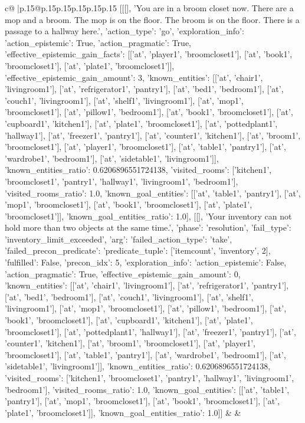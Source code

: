\documentclass{article}
\begin{document}
{\begin{supertabular}{c@{$\;$}|p{.15\linewidth}@{}p{.15\linewidth}p{.15\linewidth}p{.15\linewidth}p{.15\linewidth}p{.15\linewidth}}
{{{	 [[[], 'You are in a broom closet now. There are a mop and a broom. The mop is on the floor. The broom is on the floor. There is a passage to a hallway here.', {'action_type': 'go', 'exploration_info': {'action_epistemic': True, 'action_pragmatic': True, 'effective_epistemic_gain_facts': [['at', 'player1', 'broomcloset1'], ['at', 'book1', 'broomcloset1'], ['at', 'plate1', 'broomcloset1']], 'effective_epistemic_gain_amount': 3, 'known_entities': [['at', 'chair1', 'livingroom1'], ['at', 'refrigerator1', 'pantry1'], ['at', 'bed1', 'bedroom1'], ['at', 'couch1', 'livingroom1'], ['at', 'shelf1', 'livingroom1'], ['at', 'mop1', 'broomcloset1'], ['at', 'pillow1', 'bedroom1'], ['at', 'book1', 'broomcloset1'], ['at', 'cupboard1', 'kitchen1'], ['at', 'plate1', 'broomcloset1'], ['at', 'pottedplant1', 'hallway1'], ['at', 'freezer1', 'pantry1'], ['at', 'counter1', 'kitchen1'], ['at', 'broom1', 'broomcloset1'], ['at', 'player1', 'broomcloset1'], ['at', 'table1', 'pantry1'], ['at', 'wardrobe1', 'bedroom1'], ['at', 'sidetable1', 'livingroom1']], 'known_entities_ratio': 0.6206896551724138, 'visited_rooms': ['kitchen1', 'broomcloset1', 'pantry1', 'hallway1', 'livingroom1', 'bedroom1'], 'visited_rooms_ratio': 1.0, 'known_goal_entities': [['at', 'table1', 'pantry1'], ['at', 'mop1', 'broomcloset1'], ['at', 'book1', 'broomcloset1'], ['at', 'plate1', 'broomcloset1']], 'known_goal_entities_ratio': 1.0}}], [[], 'Your inventory can not hold more than two objects at the same time.', {'phase': 'resolution', 'fail_type': 'inventory_limit_exceeded', 'arg': {'failed_action_type': 'take', 'failed_precon_predicate': {'predicate_tuple': ['itemcount', 'inventory', 2], 'fulfilled': False, 'precon_idx': 5}}, 'exploration_info': {'action_epistemic': False, 'action_pragmatic': True, 'effective_epistemic_gain_amount': 0, 'known_entities': [['at', 'chair1', 'livingroom1'], ['at', 'refrigerator1', 'pantry1'], ['at', 'bed1', 'bedroom1'], ['at', 'couch1', 'livingroom1'], ['at', 'shelf1', 'livingroom1'], ['at', 'mop1', 'broomcloset1'], ['at', 'pillow1', 'bedroom1'], ['at', 'book1', 'broomcloset1'], ['at', 'cupboard1', 'kitchen1'], ['at', 'plate1', 'broomcloset1'], ['at', 'pottedplant1', 'hallway1'], ['at', 'freezer1', 'pantry1'], ['at', 'counter1', 'kitchen1'], ['at', 'broom1', 'broomcloset1'], ['at', 'player1', 'broomcloset1'], ['at', 'table1', 'pantry1'], ['at', 'wardrobe1', 'bedroom1'], ['at', 'sidetable1', 'livingroom1']], 'known_entities_ratio': 0.6206896551724138, 'visited_rooms': ['kitchen1', 'broomcloset1', 'pantry1', 'hallway1', 'livingroom1', 'bedroom1'], 'visited_rooms_ratio': 1.0, 'known_goal_entities': [['at', 'table1', 'pantry1'], ['at', 'mop1', 'broomcloset1'], ['at', 'book1', 'broomcloset1'], ['at', 'plate1', 'broomcloset1']], 'known_goal_entities_ratio': 1.0}}]] 
	  } 
	   } 
	   } 
	 & & \\ 
 


\end{supertabular}}
\end{document}
